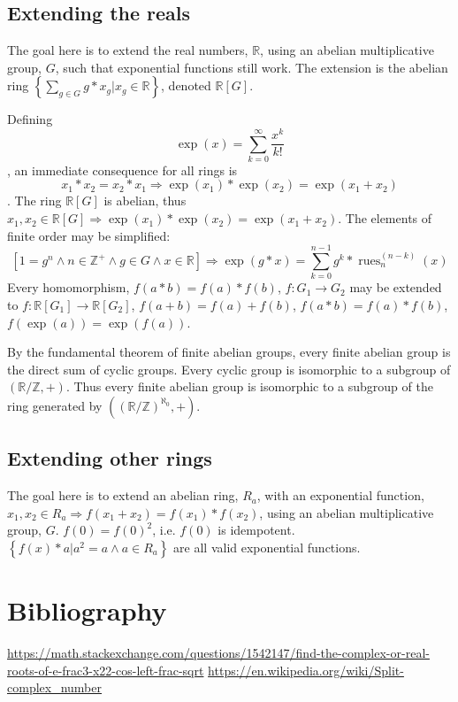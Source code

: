 \documentclass[]{article}
\DeclareMathOperator{\rues}{rues}
\newcommand{\pqty}[1]{{\left(#1\right)}}
\newcommand{\Bqty}[1]{{\left\{#1\right\}}}
\newcommand{\bqty}[1]{{\left[#1\right]}}
\numberwithin{equation}{section}
\begin{document}
	\subsection{Extending the reals}
	The goal here is to extend the real numbers, $\mathbb{R}$, using an abelian multiplicative group, $G$, such that exponential functions still work. The extension is the abelian ring $\Bqty{\sum_{g\in G}g*x_g \bigg\vert x_g\in\mathbb{R}}$, denoted $\mathbb{R}\bqty{G}$.
	
	Defining
	\begin{equation}
	\exp(x)=\sum_{k=0}^{\infty}\frac{x^k}{k!}
	\end{equation}
	, an immediate consequence for all rings is
	\begin{equation}
	x_1*x_2=x_2*x_1\Rightarrow\exp(x_1)*\exp(x_2)=\exp(x_1+x_2)
	\end{equation}
	. The ring $\mathbb{R}\bqty{G}$ is abelian, thus $x_1,x_2\in\mathbb{R}\bqty{G}\Rightarrow\exp(x_1)*\exp(x_2)=\exp(x_1+x_2)$. The elements of finite order may be simplified:
	\begin{equation}
	\bqty{1=g^n\land n\in\mathbb{Z}^+\land g\in G\land x\in\mathbb{R}}\Rightarrow\exp\pqty{g*x}=\sum_{k=0}^{n-1}g^k*\rues_n^{(n-k)}\pqty{x}
	\end{equation}
	Every homomorphism, $f\pqty{a*b}=f\pqty{a}*f\pqty{b}$, $f:G_1\rightarrow G_2$ may be extended to $f:\mathbb{R}\bqty{G_1}\rightarrow \mathbb{R}\bqty{G_2}$, $f\pqty{a+b}=f\pqty{a}+f\pqty{b}$, $f\pqty{a*b}=f\pqty{a}*f\pqty{b}$, $f\pqty{\exp\pqty{a}}=\exp\pqty{f\pqty{a}}$.
	
	By the fundamental theorem of finite abelian groups, every finite abelian group is the direct sum of cyclic groups. Every cyclic group is isomorphic to a subgroup of $\pqty{\mathbb{R}/\mathbb{Z},+}$. Thus every finite abelian group is isomorphic to a subgroup of the ring generated by $\pqty{\pqty{\mathbb{R}/\mathbb{Z}}^{\aleph_0},+}$.
	
	\subsection{Extending other rings}
	The goal here is to extend an abelian ring, $R_a$, with an exponential function, $x_1,x_2\in R_a\Rightarrow f(x_1+x_2)=f(x_1)*f(x_2)$, using an abelian multiplicative group, $G$.
	$
	f\pqty{0}=f\pqty{0}^2
	$, i.e. $f\pqty{0}$ is idempotent. $\Bqty{f(x)*a \vert a^2=a\land a\in R_a}$ are all valid exponential functions.
	
	
	
	\section{Bibliography}
	\url{https://math.stackexchange.com/questions/1542147/find-the-complex-or-real-roots-of-e-frac3-x22-cos-left-frac-sqrt}
	\url{https://en.wikipedia.org/wiki/Split-complex_number}
	
\end{document}
